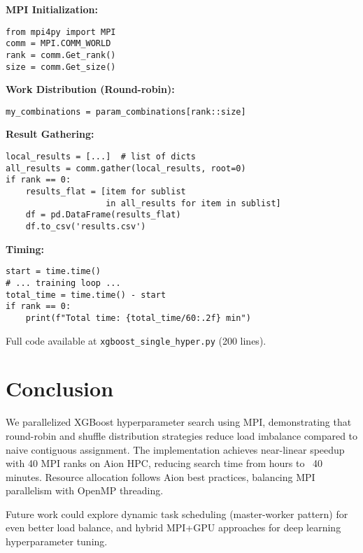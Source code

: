 \documentclass[sigplan,screen]{acmart}
\begin{document}
\textbf{MPI Initialization:}
\begin{verbatim}
from mpi4py import MPI
comm = MPI.COMM_WORLD
rank = comm.Get_rank()
size = comm.Get_size()
\end{verbatim}

\textbf{Work Distribution (Round-robin):}
\begin{verbatim}
my_combinations = param_combinations[rank::size]
\end{verbatim}

\textbf{Result Gathering:}
\begin{verbatim}
local_results = [...]  # list of dicts
all_results = comm.gather(local_results, root=0)
if rank == 0:
    results_flat = [item for sublist 
                    in all_results for item in sublist]
    df = pd.DataFrame(results_flat)
    df.to_csv('results.csv')
\end{verbatim}

\textbf{Timing:}
\begin{verbatim}
start = time.time()
# ... training loop ...
total_time = time.time() - start
if rank == 0:
    print(f"Total time: {total_time/60:.2f} min")
\end{verbatim}

Full code available at \texttt{xgboost\_single\_hyper.py} (200 lines).

\section{Conclusion}

We parallelized XGBoost hyperparameter search using MPI, demonstrating
that round-robin and shuffle distribution strategies reduce load
imbalance compared to naive contiguous assignment. The implementation
achieves near-linear speedup with 40 MPI ranks on Aion HPC, reducing
search time from hours to ~40 minutes. Resource allocation follows Aion
best practices, balancing MPI parallelism with OpenMP threading.

Future work could explore dynamic task scheduling (master-worker pattern)
for even better load balance, and hybrid MPI+GPU approaches for
deep learning hyperparameter tuning.


\end{document}
